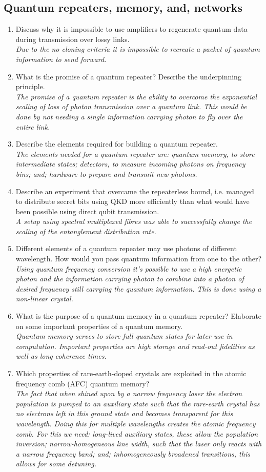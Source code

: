 \documentclass[a4paper]{scrartcl}
\newcommand{\qa}[2]{#1\\ \textit{#2}}
\begin{document}
\subsection*{Quantum repeaters, memory, and, networks}
\begin{enumerate}[label=(\alph*)]
  \item \qa{Discuss why it is impossible to use amplifiers to regenerate quantum data during transmission over lossy links.}{Due to the no cloning criteria it is impossible to recreate a packet of quantum information to send forward.}
  \item \qa{What is the promise of a quantum repeater? Describe the underpinning principle.}{The promise of a quantum repeater is the ability to overcome the exponential scaling of loss of photon transmission over a quantum link. This would be done by not needing a single information carrying photon to fly over the entire link.}
  \item \qa{Describe the elements required for building a quantum repeater.}{The elements needed for a quantum repeater are: quantum memory, to store intermediate states; detectors, to measure incoming photons on frequency bins; and; hardware to prepare and transmit new photons.}
  \item \qa{Describe an experiment that overcame the repeaterless bound, i.e. managed to distribute secret bits using QKD more efficiently than what would have been possible using direct qubit transmission.}{A setup using spectral multiplexed fibres was able to successfully change the scaling of the entanglement distribution rate.}
  \item \qa{Different elements of a quantum repeater may use photons of different wavelength. How would you pass quantum information from one to the other?}{Using quantum frequency conversion it's possible to use a high energetic photon and the information carrying photon to combine into a photon of desired frequency still carrying the quantum information. This is done using a non-linear crystal.}
  \item \qa{What is the purpose of a quantum memory in a quantum repeater? Elaborate on some important properties of a quantum memory.}{Quantum memory serves to store full quantum states for later use in computation. Important properties are high storage and read-out fidelities as well as long coherence times.}
  \item \qa{Which properties of rare-earth-doped crystals are exploited in the atomic frequency comb (AFC) quantum memory?}{The fact that when shined upon by a narrow frequency laser the electron population is pumped to an auxiliary state such that the rare-earth crystal has no electrons left in this ground state and becomes transparent for this wavelength. Doing this for multiple wavelengths creates the atomic frequency comb. For this we need: long-lived auxiliary states, these allow the population inversion; narrow-homogeneous line width, such that the laser only reacts with a narrow frequency band; and; inhomogeneously broadened transitions, this allows for some detuning.}

\end{enumerate}
\end{document}
